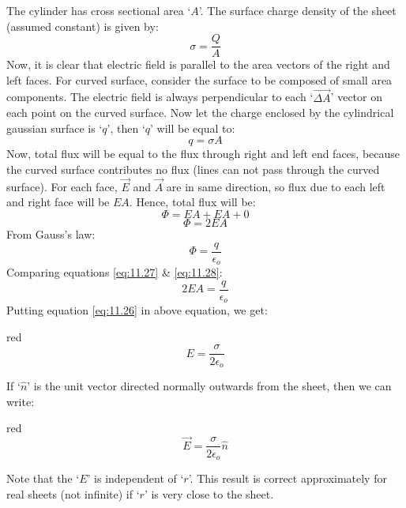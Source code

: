 The cylinder has cross sectional area `$A$’.
The surface charge density of the sheet (assumed constant) is given by:
\begin{equation}
  \sigma = \frac{Q}{A} \nonumber
\end{equation}
Now, it is clear that electric field is parallel to the area
vectors of the right and left faces. For curved surface,
consider the surface to be composed of small area components.
The electric field is always perpendicular to each `$\vec{\Delta A}$’
vector on each point on the curved surface. Now let the charge
enclosed by the cylindrical gaussian surface is `$q$',
then `$q$' will be equal to:
\begin{equation}\label{eq:11.26}
  q = \sigma A
\end{equation}
Now, total flux will be equal to the flux through right and left end faces,
because the curved surface contributes no flux (lines can  not pass
through the curved surface). For each face, $\vec{E}$ and $\vec{A}$
are in same direction, so flux due to each left and right face will be $EA$.
Hence, total flux will be:
\begin{equation}
  \Phi = EA + EA + 0 \nonumber
\end{equation}
\begin{equation}\label{eq:11.27}
  \Phi = 2EA 
\end{equation}
From Gauss's law:
\begin{equation}\label{eq:11.28}
  \Phi = \frac{q}{\epsilon_{o}}
\end{equation}
Comparing equations \ref{eq:11.27} \& \ref{eq:11.28}:
\begin{equation}
  2EA = \frac{q}{\epsilon_{o}} \nonumber
\end{equation}
Putting equation \ref{eq:11.26} in above equation, we get:
\begin{mybox}{red}{}
\begin{equation}\label{eq:11.29}
  E = \frac{\sigma}{2\epsilon_{o}}
\end{equation}
\end{mybox}
\noindent If `$\hat{n}$' is the unit vector directed normally outwards from the sheet,
then we can write:
\begin{mybox}{red}{}
  \begin{equation}\label{eq:11.30}
    \vec{E} = \frac{\sigma}{2\epsilon_{o}} \hat{n}
  \end{equation}  
\end{mybox}
Note that the `$E$’ is independent of `$r$'. This result is correct
approximately for real sheets (not infinite) if `$r$' is very close
to the sheet.
